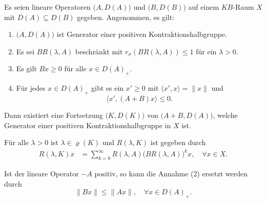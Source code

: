 \begin{fsatz}\label{Störungstheorem nach Kato}
Es seien lineare Operatoren $\big(A, D(A)\big)$ und $\big(B, D(B)\big)$ auf einem $KB$-Raum $X$  mit $D(A)\subseteq D(B)$ gegeben. Angenommen, es gilt:
\begin{enumerate}
\item $\big(A, D(A)\big)$ ist Generator einer positiven Kontraktionshalbgruppe.
\item Es  sei $BR(\lambda, A)$ beschränkt mit $r_\sigma(BR(\lambda, A))\leq1$ für ein $\lambda >0$.%
\item Es gilt $Bx\geq0$ für alle $x\in D(A)_+$.
\item Für jedes $x\in D(A)_+$ gibt es ein $x'\geq0$ mit $\langle x', x\rangle = \|x\|$ und
\begin{equation*}
   \langle x', (A+B)x\rangle\leq 0.
\end{equation*}


\end{enumerate}
Dann existiert eine Fortsetzung $\big(K, D(K)\big)$ von $\big(A+B, D(A)\big)$, welche Generator einer positiven Kontraktionshalbgruppe in $X$ ist. 

\par
Für alle $\lambda >0$ ist $\lambda\in\varrho(K)$ und $R(\lambda, K)$ ist gegeben durch
\begin{align*}\label{Darstellung der Resolvente von K}
R(\lambda, K)x
&=\sum_{k=0}^\infty R(\lambda, A)\big(BR(\lambda, A)\big)^kx,\quad \forall x\in X.
\end{align*}
\end{fsatz}



\begin{bem}\label{Störungstheorem nach Kato Annahme -A positiv}
Ist der lineare Operator $-A$ positiv, so kann die Annahme (2)  ersetzt werden durch
\begin{equation*}
    \|Bx\|\leq \|Ax\|,\quad \forall x\in D(A)_+.
\end{equation*}
\end{bem}

